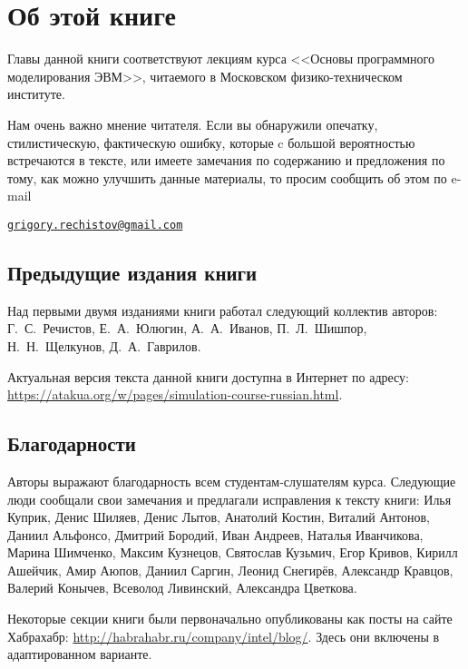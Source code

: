 
\chapter*{Об этой книге}\label{chap:contrib}

Главы данной книги соответствуют лекциям курса <<Основы программного моделирования ЭВМ>>, читаемого в Московском физико-техническом институте.

Нам очень важно мнение читателя. Если вы обнаружили опечатку, стилистическую, фактическую ошибку, которые c большой вероятностью встречаются в тексте, или имеете замечания по содержанию и предложения по тому, как можно улучшить данные материалы, то просим сообщить об этом по e-mail 

\begin{center}
\href{mailto:grigory.rechistov@gmail.com}{\texttt{grigory.rechistov@gmail.com}}
\end{center}


\section*{Предыдущие издания книги}

Над первыми двумя изданиями книги работал следующий коллектив авторов: Г.~С.~Речистов, Е.~А.~Юлюгин, А.~А.~Иванов, П.~Л.~Шишпор, Н.~Н.~Щелкунов, Д.~А.~Гаврилов.

Актуальная версия текста данной книги доступна в Интернет по адресу: \url{https://atakua.org/w/pages/simulation-course-russian.html}.

\section*{Благодарности}


Авторы выражают благодарность всем студентам-слушателям курса. Следующие люди сообщали свои замечания и предлагали исправления к тексту книги: Илья Куприк, Денис Шиляев, Денис Лытов, Анатолий Костин, Виталий Антонов, Даниил Альфонсо, Дмитрий Бородий, Иван Андреев, Наталья Иванчикова, Марина Шимченко, Максим Кузнецов, Святослав Кузьмич, Егор Кривов, Кирилл Ашейчик, Амир Аюпов, Даниил Саргин, Леонид Снегирёв, Александр Кравцов, Валерий Конычев, Всеволод Ливинский, Александра Цветкова.

Некоторые секции книги были первоначально опубликованы как посты на сайте Хабрахабр: \url{http://habrahabr.ru/company/intel/blog/}. Здесь они включены в адаптированном варианте.



